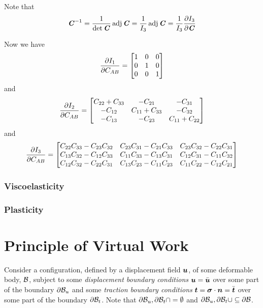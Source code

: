 Note that
\begin{equation}
   {\ensuremath{\boldsymbol{\mathit{C}}}}^{-1} =\dfrac{1}{\det \boldsymbol{\mathit{C}}}\operatorname{adj}\boldsymbol{\mathit{C}}=\dfrac{1}{I_{3}}\operatorname{adj}\boldsymbol{\mathit{C}}=\dfrac{1}{I_{3}} \dfrac{\partial I_{3}}{\partial \boldsymbol{\mathit{C}}} 
\end{equation}

Now we have
\begin{equation}
   \dfrac{\partial I_{1}}{\partial C_{AB}} =\begin{bmatrix}
    1 & 0 & 0 \\
    0 & 1 & 0 \\
    0 & 0 & 1
  \end{bmatrix}
\end{equation}
and
\begin{equation}
   \dfrac{\partial I_{2}}{\partial C_{AB}} =\begin{bmatrix}
    C_{22}+C_{33} & -C_{21} & -C_{31} \\
    -C_{12} & C_{11}+C_{33} & -C_{32} \\
    -C_{13} & -C_{23} & C_{11}+C_{22}
  \end{bmatrix}
\end{equation}
and
\begin{equation}
   \dfrac{\partial I_{3}}{\partial C_{AB}} =\begin{bmatrix}
    C_{22}C_{33}-C_{23}C_{32} & C_{23}C_{31}-C_{21}C_{33} & C_{23}C_{32}-C_{22}C_{31} \\
    C_{13}C_{32}-C_{12}C_{33} & C_{11}C_{33}-C_{13}C_{31} & C_{12}C_{31}-C_{11}C_{32} \\
    C_{12}C_{32}-C_{22}C_{31} & C_{13}C_{23}-C_{11}C_{23} & C_{11}C_{22}-C_{12}C_{21}
  \end{bmatrix}
\end{equation}

\subsubsection{Viscoelasticity}

\subsubsection{Plasticity}

\section{Principle of Virtual Work}

Consider a configuration, defined by a displacement field $ \boldsymbol{u} $, of some
deformable body, $ \mathcal{B} $, subject to some \emph{displacement
  boundary conditions} $ \boldsymbol{u} =\bar{ \boldsymbol{u} }$ over some part of the
boundary $ \partial{\ensuremath{ \mathcal{B} }} _{u}$ and some \emph{traction boundary
  conditions} $ \boldsymbol{t} = \boldsymbol{\mathit{\sigma}}  \cdot   \boldsymbol{n}  =\bar{ \boldsymbol{t} }$
over some part of the boundary $ \partial{\ensuremath{ \mathcal{B} }} _{t}$. Note that
$ \partial{\ensuremath{ \mathcal{B} }} _{u}, \partial{\ensuremath{ \mathcal{B} }} _{t}\cap=\emptyset$
and
$ \partial{\ensuremath{ \mathcal{B} }} _{u}, \partial{\ensuremath{ \mathcal{B} }} _{t}\cup\subseteq \partial{\ensuremath{ \mathcal{B} }} $.

